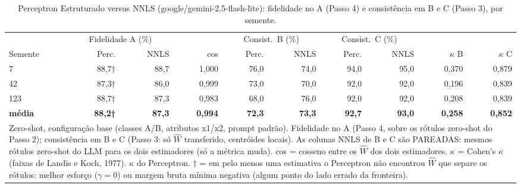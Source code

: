 \begin{table}[htbp]
\centering
\small
\caption{Perceptron Estruturado versus NNLS (google/gemini-2.5-flash-lite): fidelidade no A (Passo 4) e consistência em B e C (Passo 3), por semente.}
\label{tab:bloco1_A_passo4_perceptron_vs_nnls_flashlite}
\begin{tabular}{lrrrrrrrrr}
\toprule
 & \multicolumn{2}{c}{Fidelidade A (\%)} &  & \multicolumn{2}{c}{Consist.\ B (\%)} & \multicolumn{2}{c}{Consist.\ C (\%)} &  &  \\ \cmidrule(lr){2-3} \cmidrule(lr){5-6} \cmidrule(lr){7-8}
Semente & Perc. & NNLS & cos & Perc. & NNLS & Perc. & NNLS & $\kappa$ B & $\kappa$ C \\
\midrule
7 & 88,7† & 88,7 & 1,000 & 76,0 & 74,0 & 94,0 & 95,0 & 0,370 & 0,879 \\
42 & 87,3† & 86,0 & 0,999 & 73,0 & 70,0 & 92,0 & 92,0 & 0,196 & 0,839 \\
123 & 88,7† & 87,3 & 0,983 & 68,0 & 76,0 & 92,0 & 92,0 & 0,208 & 0,839 \\
\midrule
\textbf{média} & \textbf{88,2†} & \textbf{87,3} & \textbf{0,994} & \textbf{72,3} & \textbf{73,3} & \textbf{92,7} & \textbf{93,0} & \textbf{0,258} & \textbf{0,852} \\
\bottomrule
\multicolumn{10}{p{0.95\linewidth}}{\footnotesize Zero-shot, configuração base (classes A/B, atributos x1/x2, prompt padrão). Fidelidade no A (Passo 4, sobre os rótulos zero-shot do Passo 2); consistência em B e C (Passo 3: só $\hat{W}$ transferido, centróides locais). As colunas NNLS de B e C são PAREADAS: mesmos rótulos zero-shot do LLM para os dois estimadores (só a métrica muda). cos = cosseno entre os $\hat{W}$ dos dois estimadores. $\kappa$ = Cohen's $\kappa$ (faixas de Landis e Koch, 1977). $\kappa$ do Perceptron. † = em pelo menos uma estimativa o Perceptron não encontrou $\hat{W}$ que separe os rótulos: melhor esforço ($\gamma = 0$) ou margem bruta mínima negativa (algum ponto do lado errado da fronteira).} \\
\end{tabular}
\end{table}
